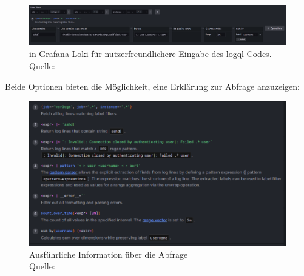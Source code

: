 \begin{figure}[H]
   \centering
   \includegraphics[width=1\textwidth]{assets/klickibuntyGrafana.png}
   \caption[ in Grafana Loki für nutzerfreundlichere Eingabe des \gls{logql}-Codes.]
   { in Grafana Loki für nutzerfreundlichere Eingabe des \gls{logql}-Codes. Quelle: \citep{VoidQuark_sshlogs}}
   \centering
\end{figure}

Beide Optionen bieten die Möglichkeit, eine Erklärung zur Abfrage anzuzeigen:
\begin{figure}[H]
   \centering
   \includegraphics[width=1\textwidth]{assets/erklaerungLoki.png}
   \caption[Ausführliche Information über die Abfrage]
   {Ausführliche Information über die Abfrage\\Quelle: \citep{Grafana_QueryEditor}}
   \centering
\end{figure}


